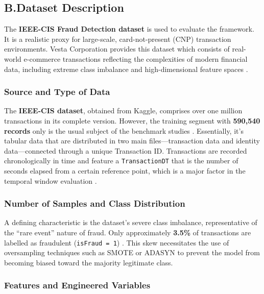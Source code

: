 \documentclass[12pt, a4paper]{article}
\begin{document}
\subsection{B.\quad Dataset Description}
 
The \textbf{IEEE-CIS Fraud Detection dataset} \cite{ieeecisFraud} is used to evaluate the framework. It is a realistic proxy for large-scale, card-not-present (CNP) transaction environments. Vesta Corporation provides this dataset which consists of real-world e-commerce transactions reflecting the complexities of modern financial data, including extreme class imbalance and high-dimensional feature spaces \cite{fraudbenchmark2022}.
 
\subsubsection*{Source and Type of Data}
 
The \textbf{IEEE-CIS dataset}, obtained from Kaggle, comprises over one million transactions in its complete version. However, the training segment with \textbf{590,540 records} only is the usual subject of the benchmark studies \cite{ieeecisanalysis2024}. Essentially, it's tabular data that are distributed in two main files---transaction data and identity data---connected through a unique Transaction ID. Transactions are recorded chronologically in time and feature a \texttt{TransactionDT} that is the number of seconds elapsed from a certain reference point, which is a major factor in the temporal window evaluation \cite{ieeecisFraud}.
 
\subsubsection*{Number of Samples and Class Distribution}
 
A defining characteristic is the dataset's severe class imbalance, representative of the ``rare event'' nature of fraud. Only approximately \textbf{3.5\%} of transactions are labelled as fraudulent (\texttt{isFraud = 1}) \cite{ieeecisanalysis2024}. This skew necessitates the use of oversampling techniques such as SMOTE \cite{smote2002} or ADASYN to prevent the model from becoming biased toward the majority legitimate class.
 
\subsubsection*{Features and Engineered Variables}
 
\end{document}
